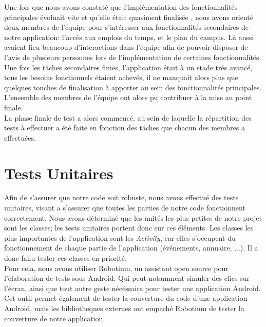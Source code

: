 Une fois que nous avons constaté que l’implémentation des fonctionnalités principales évoluait vite et qu’elle était quasiment finalisée , nous avons orienté deux membres de l’équipe pour s’intéresser aux fonctionnalités secondaires de notre application: l’accès aux emplois du temps, et le plan du campus. Là aussi avaient lieu beaucoup d'interactions dans l’équipe afin de pouvoir disposer de l’avis de plusieurs personnes lors de l’implémentation de certaines fonctionnalités.\\
Une fois les tâches secondaires finies, l’application était à un stade très avancé, tous les besoins fonctionnels  étaient achevés, il ne manquait alors plus que quelques touches de finalisation à apporter au sein des fonctionnalités principales. L’ensemble des membres de l’équipe ont alors pu contribuer à la mise au point finale.\\
La phase finale de test a alors commencé, au sein de laquelle la répartition des tests à effectuer a été faite en fonction des tâches que chacun des membres a effectuées.

\section{Tests Unitaires}
Afin de s'assurer que notre code soit robuste, nous avons effectué des tests unitaires, visant a s'assurer que toutes les parties de notre code fonctionnent correctement. Nous avons déterminé que les unités les plus petites de notre projet sont les classes; les tests unitaires portent donc sur ces éléments. Les classes les plus importantes de l’application sont les \emph{Activity}, car elles s’occupent du fonctionnement de chaque partie de l’application (événements, annuaire, ...). Il a donc fallu tester ces classes en priorité.\\

Pour cela, nous avons utiliser Robotium, un assistant open source pour l'élaboration de tests sous Android. Qui peut notamment simuler des clics sur l'écran, ainsi que tout autre geste nécéssaire pour tester une application Android.
Cet outil permet également de tester la couverture du code d'une application Android, mais les bibliotheques externes ont empeché Robotium de tester la couverture de notre application.